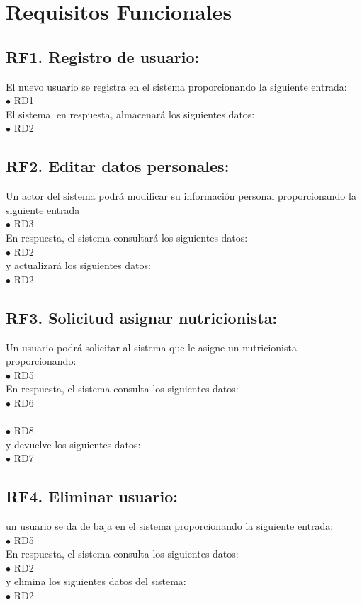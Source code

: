 \documentclass[12pt,letterpaper]{article}
\begin{document}
\section{Requisitos Funcionales}
{\setlength{\parindent}{0cm}
\subsection{RF1. Registro de usuario:} El nuevo usuario se registra en el sistema proporcionando la siguiente entrada:
\\$\bullet$	RD1\\ 
El sistema, en respuesta, almacenará los siguientes datos:
\\ $\bullet$	RD2\\ 
\subsection{RF2. Editar datos personales:} Un actor del sistema podrá modificar su información personal proporcionando la siguiente entrada
\\ $\bullet$	RD3\\ 
En respuesta, el sistema consultará los siguientes datos:
\\ $\bullet$	RD2\\

y actualizará los siguientes datos:
\\ $\bullet$	RD2\\ 

\subsection{RF3. Solicitud asignar nutricionista:} Un usuario podrá solicitar al sistema que le asigne un nutricionista proporcionando:
\\ $\bullet$	RD5\\ 
En respuesta, el sistema consulta los siguientes datos:
\\ $\bullet$	RD6\\ 
\\ $\bullet$	RD8\\ 
y devuelve los siguientes datos:
\\ $\bullet$	RD7\\ 

\subsection{RF4. Eliminar usuario:} un usuario se da de baja en el sistema proporcionando la siguiente entrada:
\\ $\bullet$	RD5\\ 
En respuesta, el sistema consulta los siguientes datos:
\\ $\bullet$	RD2\\ 
y elimina los siguientes datos del sistema:
\\ $\bullet$	RD2\\ 

}
\end{document}
